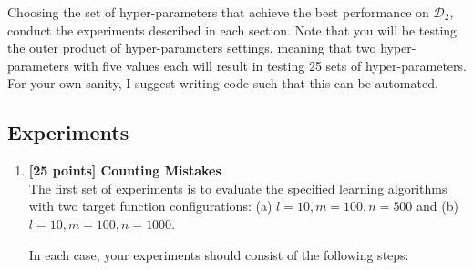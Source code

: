 \documentclass[12pt,letterpaper]{article}
\begin{document}
Choosing the set of hyper-parameters that achieve the best performance on $\mathcal{D}_2$, conduct the experiments described in each section.  Note that you will be testing the outer product of hyper-parameters settings, meaning that two hyper-parameters with five values each will result in testing 25 sets of hyper-parameters. For your own sanity, I suggest writing code such that this can be automated.

\subsection*{Experiments}

\begin{enumerate}
\item
{\bf [25 points] Counting Mistakes}\\

The first set of experiments is to evaluate the specified learning algorithms with two target function configurations: (a) $l=10, m=100, n=500$ and (b) $l = 10, m=100, n=1000$.

In each case, your experiments should consist of the following steps:


\end{enumerate}
\end{document}
